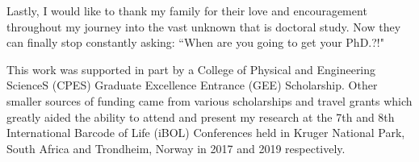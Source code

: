 \begin{acknowledgements}
\vspace{5mm}

\noindent Lastly, I would like to thank my family for their love and encouragement throughout my journey into the vast unknown that is doctoral study. Now they can finally stop constantly asking: ``When are you going to get your PhD.?!"

\vspace{5mm}

\noindent This work was supported in part by a College of Physical and Engineering ScienceS (CPES) Graduate Excellence Entrance (GEE) Scholarship. Other smaller sources of funding came from various scholarships and travel grants which greatly aided the ability to attend and present my research at the 7th and 8th International Barcode of Life (iBOL) Conferences held in Kruger National Park, South Africa and Trondheim, Norway in 2017 and 2019 respectively.


\end{acknowledgements}
\dsp
